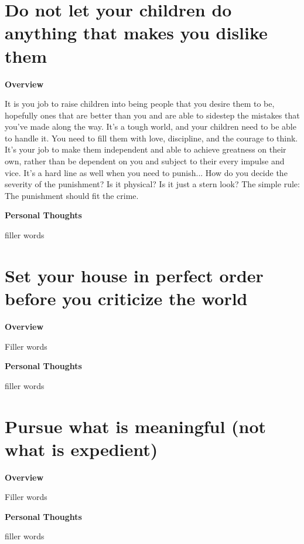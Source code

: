 \documentclass{article}
\begin{document}
\section{Do not let your children do anything that makes you dislike them}
        \begin{multicols}{2}
        \begin{center}
            \textbf{Overview}
        \end{center}
        
        It is you job to raise children into being people that you desire them to be, hopefully ones that are better than you and are able to sidestep the mistakes that you've made along the way. It's a tough world, and your children need to be able to handle it. You need to fill them with love, discipline, and the courage to think. It's your job to make them independent and able to achieve greatness on their own, rather than be dependent on you and subject to their every impulse and vice. It's a hard line as well when you need to punish... How do you decide the severity of the punishment? Is it physical? Is it just a stern look? The simple rule: The punishment should fit the crime.

        \begin{center}
            \textbf{Personal Thoughts}
        \end{center}
        
        filler words
    \end{multicols}

\section{Set your house in perfect order before you criticize the world}
        \begin{multicols}{2}
        \begin{center}
            \textbf{Overview}
        \end{center}
        
        Filler words 

        \begin{center}
            \textbf{Personal Thoughts}
        \end{center}
        
        filler words
    \end{multicols}
    
\section{Pursue what is meaningful (not what is expedient)}
        \begin{multicols}{2}
        \begin{center}
            \textbf{Overview}
        \end{center}
        
        Filler words 

        \begin{center}
            \textbf{Personal Thoughts}
        \end{center}
        
        filler words
    \end{multicols}
    
\end{document}
